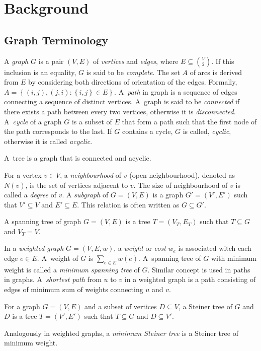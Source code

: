 \chapter{Background}\label{sec:back}

\section{Graph Terminology}\label{sec:back:graph}

A \emph{graph} $G$ is a pair $(V,E)$ of \emph{vertices} and \emph{edges}, where $E\subseteq {{V}\choose{2}}$.
If this inclusion is an equality, $G$ is said to be \emph{complete}.
 The set $A$ of arcs is derived from $E$ by considering both directions of orientation of the edges.
 Formally, $A=\left\{(i,j),(j,i):\left\{i,j\right\}\in E\right\}$.
A~\emph{path} in graph is a sequence of edges connecting a sequence of distinct vertices.
A~graph is said to be \emph{connected} if there exists a path between every two vertices, otherwise it is \emph{disconnected}.
A~\emph{cycle} of a graph $G$ is a subset of $E$ that form a path such that the first node of the path corresponds to the last. 
If $G$ contains a cycle, $G$ is called, \emph{cyclic}, otherwise it is called \emph{acyclic}.
\begin{definition}
A~tree is a graph that is connected and acyclic.
\end{definition}
For a vertex $v\in V$, a \emph{neighbourhood} of $v$ (open neighbourhood), denoted as $N(v)$, is the set of vertices adjacent to $v$.
The size of neighbourhood of $v$ is called a \emph{degree} of $v$.
A \emph{subgraph} of $G=(V,E)$ is a graph $G'=(V',E')$ such that $V'\subseteq V$ and $E'\subseteq E$.
This relation is often written as $G\subseteq G'$.
\begin{definition}
A spanning tree of graph $G=(V,E)$ is a tree $T=(V_T,E_T)$ such that $T\subseteq G$ and $V_T=V$.
\end{definition}

In a \emph{weighted graph} $G=(V,E,w)$, a \emph{weight} or \emph{cost} $w_e$ is associated witch each edge $e\in E$.
A~weight of $G$ is $\sum_{e\in E}w(e)$.
A~spanning tree of $G$ with minimum weight is called a \emph{minimum spanning tree} of $G$.
Similar concept is used in paths in graphs.
A~\emph{shortest path} from $u$ to $v$ in a weighted graph is a path consisting of edges of minimum sum of weights connecting $u$ and $v$.
\begin{definition}
	For a graph $G=(V,E)$ and a subset of vertices $D\subseteq V$, a Steiner tree of $G$ and $D$ is a tree $T=(V',E')$ such that $T\subseteq G$ and $D\subseteq V'$.
\end{definition}
Analogously in weighted graphs, a \emph{minimum Steiner tree} is a Steiner tree of minimum weight.

